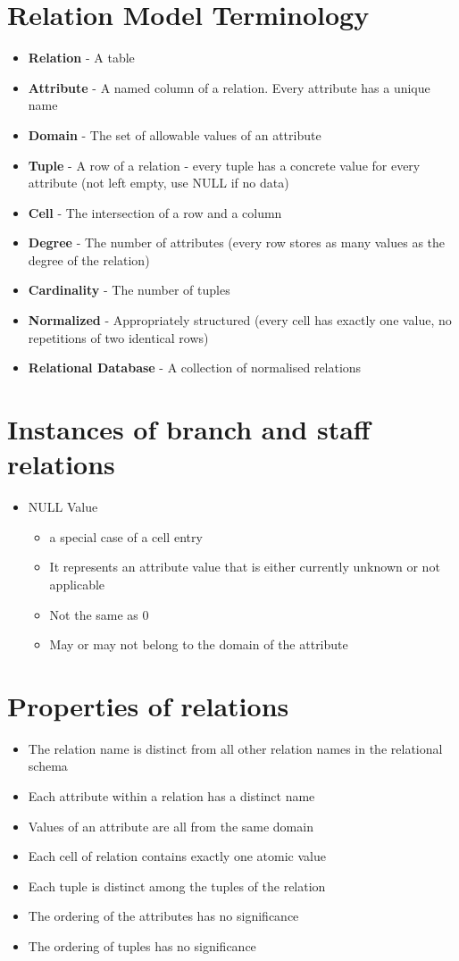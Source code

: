 \documentclass{article}[18pt]
\begin{document}
\section{Relation Model Terminology}
\begin{itemize}
	\item \textbf{Relation} - A table
	\item \textbf{Attribute} - A named column of a relation. Every attribute has a unique name
	\item \textbf{Domain} - The set of allowable values of an attribute
	\item \textbf{Tuple} - A row of a relation - every tuple has a concrete value for every attribute (not left empty, use NULL if no data)
	\item \textbf{Cell} - The intersection of a row and a column
	\item \textbf{Degree} - The number of attributes (every row stores as many values as the degree of the relation)
	\item \textbf{Cardinality} - The number of tuples
	\item \textbf{Normalized} - Appropriately structured (every cell has exactly one value, no repetitions of two identical rows)
	\item \textbf{Relational Database} - A collection of normalised relations
\end{itemize}
\section{Instances of branch and staff relations}
\begin{itemize}
	\item NULL Value
	\begin{itemize}
		\item a special case of a cell entry
		\item It represents an attribute value that is either currently unknown or not applicable
		\item Not the same as 0
		\item May or may not belong to the domain of the attribute
	\end{itemize}
\end{itemize}
\section{Properties of relations}
\begin{itemize}
	\item The relation name is distinct from all other relation names in the relational schema
	\item Each attribute within a relation has a distinct name
	\item Values of an attribute are all from the same domain
	\item Each cell of relation contains exactly one atomic value
	\item Each tuple is distinct among the tuples of the relation
	\item The ordering of the attributes has no significance
	\item The ordering of tuples has no significance
\end{itemize}
\end{document}
